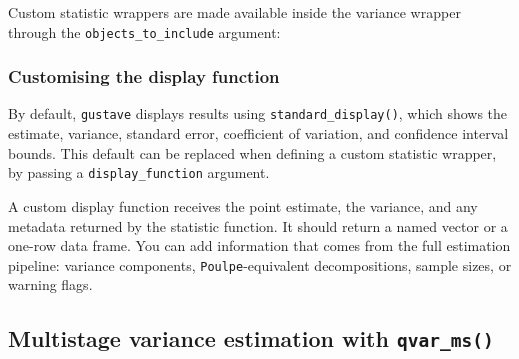 \documentclass[
]{article}
\newenvironment{Shaded}{\begin{snugshade}}{\end{snugshade}}
\newcommand{\AttributeTok}[1]{\textcolor[rgb]{0.13,0.29,0.53}{#1}}
\newcommand{\CommentTok}[1]{\textcolor[rgb]{0.56,0.35,0.01}{\textit{#1}}}
\newcommand{\FunctionTok}[1]{\textcolor[rgb]{0.13,0.29,0.53}{\textbf{#1}}}
\newcommand{\NormalTok}[1]{#1}
\newcommand{\OtherTok}[1]{\textcolor[rgb]{0.56,0.35,0.01}{#1}}
\newcommand{\SpecialCharTok}[1]{\textcolor[rgb]{0.81,0.36,0.00}{\textbf{#1}}}
\newcommand{\StringTok}[1]{\textcolor[rgb]{0.31,0.60,0.02}{#1}}
\begin{document}
Custom statistic wrappers are made available inside the variance wrapper
through the \texttt{objects\_to\_include} argument:

\begin{Shaded}
\end{Shaded}

\subsubsection{Customising the display
function}\label{customising-the-display-function}

By default, \texttt{gustave} displays results using
\texttt{standard\_display()}, which shows the estimate, variance,
standard error, coefficient of variation, and confidence interval
bounds. This default can be replaced when defining a custom statistic
wrapper, by passing a \texttt{display\_function} argument.

A custom display function receives the point estimate, the variance, and
any metadata returned by the statistic function. It should return a
named vector or a one-row data frame. You can add information that comes
from the full estimation pipeline: variance components,
\texttt{Poulpe}-equivalent decompositions, sample sizes, or warning
flags.

\subsection{\texorpdfstring{Multistage variance estimation with
\texttt{qvar\_ms()}}{Multistage variance estimation with qvar\_ms()}}\label{multistage-variance-estimation-with-qvar_ms}
\end{document}
